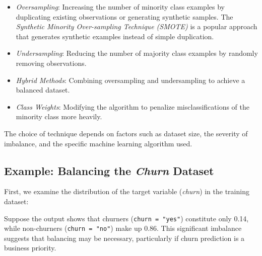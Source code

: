 \documentclass[
  11pt,
]{book}
\makeatletter
\newenvironment{Shaded}{}{}
\newcommand{\CommentTok}[1]{\textcolor[rgb]{0.36,0.36,0.36}{#1}}
\newcommand{\DecValTok}[1]{#1}
\newcommand{\FloatTok}[1]{#1}
\newcommand{\FunctionTok}[1]{#1}
\newcommand{\NormalTok}[1]{#1}
\newcommand{\SpecialCharTok}[1]{\textcolor[rgb]{0.39,0.39,0.39}{#1}}
\providecommand{\tightlist}{%
  \setlength{\itemsep}{0pt}\setlength{\parskip}{0pt}}
\newenvironment{kframe}{%
\medskip{}
\setlength{\fboxsep}{.8em}
 \def\at@end@of@kframe{}%
 \ifinner\ifhmode%
  \def\at@end@of@kframe{\end{minipage}}%
  \begin{minipage}{\columnwidth}%
 \fi\fi%
 \def\FrameCommand##1{\hskip\@totalleftmargin \hskip-\fboxsep
 \colorbox{shadecolor}{##1}\hskip-\fboxsep
     \hskip-\linewidth \hskip-\@totalleftmargin \hskip\columnwidth}%
 \MakeFramed {\advance\hsize-\width
   \@totalleftmargin\z@ \linewidth\hsize
   \@setminipage}}%
 {\par\unskip\endMakeFramed%
 \at@end@of@kframe}
\renewenvironment{Shaded}{\begin{kframe}}{\end{kframe}}
\theoremstyle{definition}
\theoremstyle{definition}
\theoremstyle{definition}
\theoremstyle{definition}
\theoremstyle{remark}
\makeatother
\begin{document}
\begin{itemize}
\tightlist
\item
  \emph{Oversampling}: Increasing the number of minority class examples by duplicating existing observations or generating synthetic samples. The \emph{Synthetic Minority Over-sampling Technique (SMOTE)} is a popular approach that generates synthetic examples instead of simple duplication.
\item
  \emph{Undersampling}: Reducing the number of majority class examples by randomly removing observations.
\item
  \emph{Hybrid Methods}: Combining oversampling and undersampling to achieve a balanced dataset.
\item
  \emph{Class Weights}: Modifying the algorithm to penalize misclassifications of the minority class more heavily.
\end{itemize}

The choice of technique depends on factors such as dataset size, the severity of imbalance, and the specific machine learning algorithm used.

\subsection*{\texorpdfstring{Example: Balancing the \emph{Churn} Dataset}{Example: Balancing the Churn Dataset}}\label{example-balancing-the-churn-dataset}


First, we examine the distribution of the target variable (\emph{churn}) in the training dataset:

\begin{Shaded}
\end{Shaded}

Suppose the output shows that churners (\texttt{churn\ =\ "yes"}) constitute only 0.14, while non-churners (\texttt{churn\ =\ "no"}) make up 0.86. This significant imbalance suggests that balancing may be necessary, particularly if churn prediction is a business priority.
\end{document}
